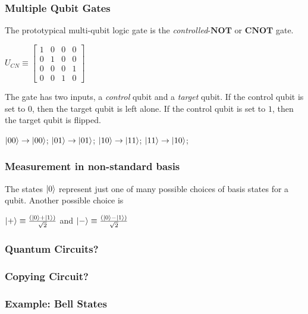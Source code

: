 \documentclass{article}
\begin{document}
\subsubsection{Multiple Qubit Gates}
The prototypical multi-qubit logic gate is the \emph{controlled}-$\mathbf{NOT}$
or $\mathbf{CNOT}$ gate.

\begin{center}
  $ \mathit{U_{\mathit{CN}}} \equiv \begin{bmatrix}
    1 & 0 & 0 & 0 \\
    0 & 1 & 0 & 0 \\
    0 & 0 & 0 & 1 \\
    0 & 0 & 1 & 0
  \end{bmatrix}$
\end{center}
The gate has two inputs, a \emph{control} qubit and a \emph{target} qubit. If
the control qubit is set to $0$, then the target qubit is left alone. If the
control qubit is set to $1$, then the target qubit is flipped.

\begin{center}
  $\ket{00} \to \ket{00}$;
  $\ket{01} \to \ket{01}$;
  $\ket{10} \to \ket{11}$;
  $\ket{11} \to \ket{10}$;
\end{center}

\subsubsection{Measurement in non-standard basis}
The states $\ket{0}$ represent just one of many possible choices of basis
states for a qubit. Another possible choice is

\begin{center}
  $\ket{+} \equiv \frac{(\ket{0} + \ket{1})}{\sqrt{2}} $ and
  $\ket{-} \equiv \frac{(\ket{0} - \ket{1})}{\sqrt{2}} $
\end{center}

\subsubsection{Quantum Circuits?}

\subsubsection{Copying Circuit?}

\subsubsection{Example: Bell States}
\end{document}
